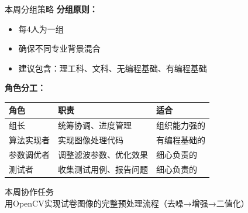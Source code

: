 \documentclass[aspectratio=169, 10pt]{beamer}
\begin{document}
\begin{frame}{本周分组策略}
    \textbf{分组原则：}
    \begin{itemize}
        \item 每4人为一组
        \item 确保不同专业背景混合
        \item 建议包含：理工科、文科、无编程基础、有编程基础
    \end{itemize}

    \vspace{0.3cm}

    \textbf{角色分工：}
    \begin{table}
        \centering
        \small
        \begin{tabular}{lp{6cm}l}
            \toprule
            \textbf{角色} & \textbf{职责} & \textbf{适合} \\
            \midrule
            组长 & 统筹协调、进度管理 & 组织能力强的 \\
            算法实现者 & 实现图像处理代码 & 有编程基础的 \\
            参数调优者 & 调整滤波参数、优化效果 & 细心负责的 \\
            测试者 & 收集测试用例、报告问题 & 细心负责的 \\
            \bottomrule
        \end{tabular}
    \end{table}

    \vspace{0.3cm}

    \begin{block}{本周协作任务}
        用OpenCV实现试卷图像的完整预处理流程（去噪→增强→二值化）
    \end{block}
\end{frame}
\end{document}
